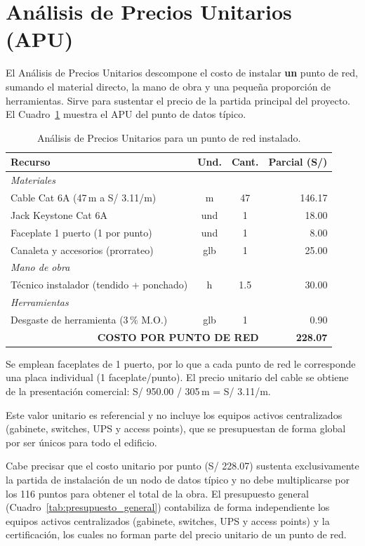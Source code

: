 \section{Análisis de Precios Unitarios (APU)}
El Análisis de Precios Unitarios descompone el costo de instalar \textbf{un} punto de red, sumando el material directo, la mano de obra y una pequeña proporción de herramientas. Sirve para sustentar el precio de la partida principal del proyecto. El Cuadro~\ref{tab:apu} muestra el APU del punto de datos típico.

\begin{table}[H]
\centering
\caption{Análisis de Precios Unitarios para un punto de red instalado.}
\label{tab:apu}
\begin{tabular}{lccr}
\hline
\textbf{Recurso} & \textbf{Und.} & \textbf{Cant.} & \textbf{Parcial (S/)} \\
\hline
\multicolumn{4}{l}{\textit{Materiales}} \\
Cable Cat 6A (47\,m a S/ 3.11/m)        & m   & 47   & 146.17 \\
Jack Keystone Cat 6A                    & und & 1    & 18.00 \\
Faceplate 1 puerto (1 por punto)        & und & 1    & 8.00 \\
Canaleta y accesorios (prorrateo)       & glb & 1    & 25.00 \\
%
\multicolumn{4}{l}{\textit{Mano de obra}} \\
Técnico instalador (tendido + ponchado) & h   & 1.5  & 30.00 \\
%
\multicolumn{4}{l}{\textit{Herramientas}} \\
Desgaste de herramienta (3\,\% M.O.)    & glb & 1    & 0.90 \\
\hline
\multicolumn{3}{r}{\textbf{COSTO POR PUNTO DE RED}} & \textbf{228.07} \\
\hline
\end{tabular}
\end{table}

\noindent Se emplean faceplates de 1 puerto, por lo que a cada punto de red le corresponde una placa individual (1 faceplate/punto). El precio unitario del cable se obtiene de la presentación comercial: S/ 950.00 / 305\,m = S/ 3.11/m.

\noindent Este valor unitario es referencial y no incluye los equipos activos centralizados (gabinete, switches, UPS y access points), que se presupuestan de forma global por ser únicos para todo el edificio.

\noindent Cabe precisar que el costo unitario por punto (S/ 228.07) sustenta exclusivamente la partida de instalación de un nodo de datos típico y no debe multiplicarse por los 116 puntos para obtener el total de la obra. El presupuesto general (Cuadro~\ref{tab:presupuesto_general}) contabiliza de forma independiente los equipos activos centralizados (gabinete, switches, UPS y access points) y la certificación, los cuales no forman parte del precio unitario de un punto de red.

